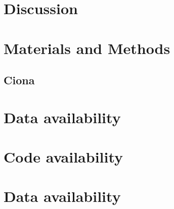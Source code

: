 \section{Discussion}

\section{Materials and Methods}

\subsection{Ciona}

\section{Data availability}

\section{Code availability}

\section{Data availability}

